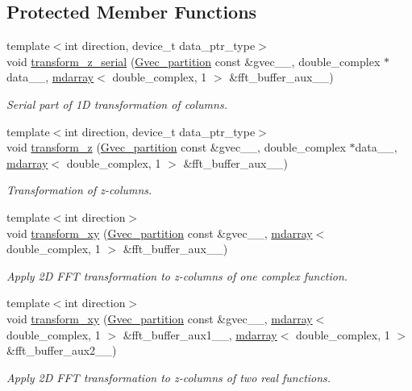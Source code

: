 \subsection*{Protected Member Functions}
\begin{DoxyCompactItemize}
\item 
{\footnotesize template$<$int direction, device\+\_\+t data\+\_\+ptr\+\_\+type$>$ }\\void \hyperlink{classsddk_1_1_f_f_t3_d_a4494521f39d1119acecf75fec13f2e17}{transform\+\_\+z\+\_\+serial} (\hyperlink{classsddk_1_1_gvec__partition}{Gvec\+\_\+partition} const \&gvec\+\_\+\+\_\+, double\+\_\+complex $\ast$data\+\_\+\+\_\+, \hyperlink{classsddk_1_1mdarray}{mdarray}$<$ double\+\_\+complex, 1 $>$ \&fft\+\_\+buffer\+\_\+aux\+\_\+\+\_\+)
\begin{DoxyCompactList}\small\item\em Serial part of 1\+D transformation of columns. \end{DoxyCompactList}\item 
{\footnotesize template$<$int direction, device\+\_\+t data\+\_\+ptr\+\_\+type$>$ }\\void \hyperlink{classsddk_1_1_f_f_t3_d_a6e72f6780e3b2cc3d534b2fdb9a70134}{transform\+\_\+z} (\hyperlink{classsddk_1_1_gvec__partition}{Gvec\+\_\+partition} const \&gvec\+\_\+\+\_\+, double\+\_\+complex $\ast$data\+\_\+\+\_\+, \hyperlink{classsddk_1_1mdarray}{mdarray}$<$ double\+\_\+complex, 1 $>$ \&fft\+\_\+buffer\+\_\+aux\+\_\+\+\_\+)
\begin{DoxyCompactList}\small\item\em Transformation of z-\/columns. \end{DoxyCompactList}\item 
{\footnotesize template$<$int direction$>$ }\\void \hyperlink{classsddk_1_1_f_f_t3_d_ab28706d0d5bc527ae307b1b00e2ad9bc}{transform\+\_\+xy} (\hyperlink{classsddk_1_1_gvec__partition}{Gvec\+\_\+partition} const \&gvec\+\_\+\+\_\+, \hyperlink{classsddk_1_1mdarray}{mdarray}$<$ double\+\_\+complex, 1 $>$ \&fft\+\_\+buffer\+\_\+aux\+\_\+\+\_\+)
\begin{DoxyCompactList}\small\item\em Apply 2\+D F\+F\+T transformation to z-\/columns of one complex function. \end{DoxyCompactList}\item 
{\footnotesize template$<$int direction$>$ }\\void \hyperlink{classsddk_1_1_f_f_t3_d_a2e2569de250cec0cfd2e556f8d0f3905}{transform\+\_\+xy} (\hyperlink{classsddk_1_1_gvec__partition}{Gvec\+\_\+partition} const \&gvec\+\_\+\+\_\+, \hyperlink{classsddk_1_1mdarray}{mdarray}$<$ double\+\_\+complex, 1 $>$ \&fft\+\_\+buffer\+\_\+aux1\+\_\+\+\_\+, \hyperlink{classsddk_1_1mdarray}{mdarray}$<$ double\+\_\+complex, 1 $>$ \&fft\+\_\+buffer\+\_\+aux2\+\_\+\+\_\+)
\begin{DoxyCompactList}\small\item\em Apply 2\+D F\+F\+T transformation to z-\/columns of two real functions. \end{DoxyCompactList}\end{DoxyCompactItemize}
